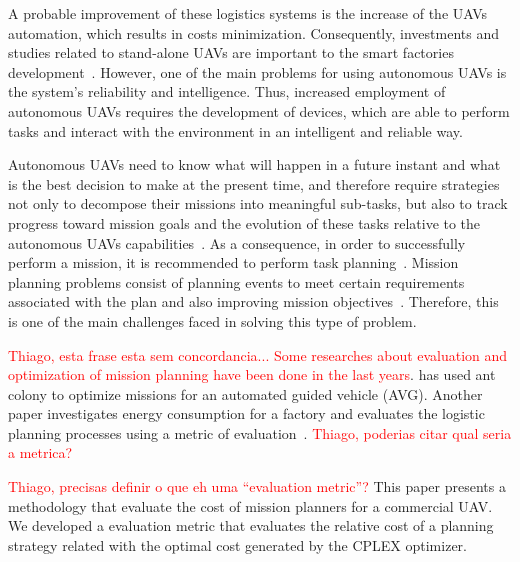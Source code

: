 \documentclass[conference,harvard,brazil,english]{sbatex}
\begin{document}
A probable improvement of these logistics systems is the increase of the UAVs automation, which results in costs minimization. Consequently, investments and studies related to stand-alone UAVs are important to the smart factories development~\cite{hern2014dhl}. However, one of the main problems for using autonomous UAVs is the system's reliability and intelligence. Thus, increased employment of autonomous UAVs requires the development of devices, which are able to perform tasks and interact with the environment in an intelligent and reliable way.

Autonomous UAVs need to know what will happen in a future instant and what is the best decision to make at the present time, and therefore require strategies not only to decompose their missions into meaningful sub-tasks, but also to track progress toward mission goals and the evolution of these tasks relative to the autonomous UAVs capabilities~\cite{finn2012developments}. As a consequence, in order to successfully perform a mission, it is recommended to perform task planning~\cite{successplan}. Mission planning problems consist of planning events to meet certain requirements associated with the plan and also improving mission objectives~\cite{krozel1988search}. Therefore, this is one of the main challenges faced in solving this type of problem.

\textcolor{red}{Thiago, esta frase esta sem concordancia... Some researches about evaluation and optimization of mission planning have been done in the last years}.  has used ant colony to optimize missions for an automated guided vehicle (AVG). Another paper investigates energy consumption for a factory and evaluates the logistic planning processes using a metric of evaluation~\cite{muller2012analyzing}. \textcolor{red}{Thiago, poderias citar qual seria a metrica?}

\textcolor{red}{Thiago, precisas definir o que eh uma ``evaluation metric''?} This paper presents a methodology that evaluate the cost of mission planners for a commercial UAV. We developed a evaluation metric that evaluates the relative cost of a planning strategy related with the optimal cost generated by the CPLEX optimizer. %
\end{document}
